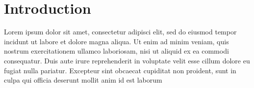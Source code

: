 \chapter{Introduction}

Lorem ipsum dolor sit amet, consectetur adipisci elit, sed do eiusmod tempor incidunt ut labore et dolore magna aliqua. 
Ut enim ad minim veniam, quis nostrum exercitationem ullamco laboriosam, nisi ut aliquid ex ea commodi consequatur. 
Duis aute irure reprehenderit in voluptate velit esse cillum dolore eu fugiat nulla pariatur. 
Excepteur sint obcaecat cupiditat non proident, sunt in culpa qui officia deserunt mollit anim id est laborum